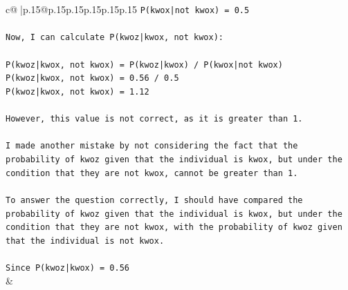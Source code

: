 \documentclass{article}
\begin{document}
{\begin{supertabular}{c@{$\;$}|p{.15\linewidth}@{}p{.15\linewidth}p{.15\linewidth}p{.15\linewidth}p{.15\linewidth}p{.15\linewidth}}
{{{\texttt{P(kwox|not kwox) = 0.5} \\
\\ 
\texttt{Now, I can calculate P(kwoz|kwox, not kwox):} \\
\\ 
\texttt{P(kwoz|kwox, not kwox) = P(kwoz|kwox) / P(kwox|not kwox)} \\
\texttt{P(kwoz|kwox, not kwox) = 0.56 / 0.5} \\
\texttt{P(kwoz|kwox, not kwox) = 1.12} \\
\\ 
\texttt{However, this value is not correct, as it is greater than 1. } \\
\\ 
\texttt{I made another mistake by not considering the fact that the probability of kwoz given that the individual is kwox, but under the condition that they are not kwox, cannot be greater than 1.} \\
\\ 
\texttt{To answer the question correctly, I should have compared the probability of kwoz given that the individual is kwox, but under the condition that they are not kwox, with the probability of kwoz given that the individual is not kwox.} \\
\\ 
\texttt{Since P(kwoz|kwox) = 0.56} \\
            }
        }
    }
    & \\ \\

\end{supertabular}
}
\end{document}
